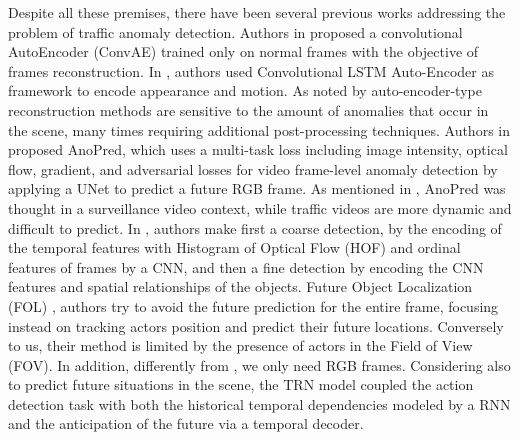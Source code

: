 Despite all these premises, there have been several previous works addressing the problem of traffic anomaly detection.
Authors in \cite{hasan2016learning} proposed a convolutional AutoEncoder (ConvAE) trained only on normal frames with the objective of frames reconstruction.
In \cite{luo2017remembering, wang2018abnormal}, authors used Convolutional LSTM Auto-Encoder as framework to encode appearance and motion.
As noted by \cite{ramachandra2020survey} auto-encoder-type reconstruction methods are sensitive to the amount of anomalies that occur in the scene, many times requiring additional post-processing techniques.
Authors in \cite{liu2018future} proposed AnoPred, which uses a multi-task loss including image intensity, optical flow, gradient, and adversarial losses for video frame-level anomaly detection by applying a UNet to predict a future RGB frame.
As mentioned in \cite{9712446}, AnoPred was thought in a surveillance video context, while traffic videos are more dynamic and difficult to predict.
In \cite{zhou_spatio-temporal_2022}, authors make first a coarse detection, by the encoding of the temporal features with Histogram of Optical Flow (HOF) \cite{wang2013action} and ordinal features of frames by a CNN, and then a fine detection by encoding the CNN features and spatial relationships of the objects.
Future Object Localization (FOL) \cite{9712446}, authors try to avoid the future prediction for the entire frame, focusing instead on tracking actors position and predict their future locations.
Conversely to us, their method is limited by the presence of actors in the Field of View (FOV).
In addition, differently from \cite{liu2018future, 9712446, zhou_spatio-temporal_2022}, we only need RGB frames.
Considering also to predict future situations in the scene, the TRN model \cite{xu2019temporal} coupled the action detection task with both the historical temporal dependencies modeled by a RNN and the anticipation of the future via a temporal decoder.

